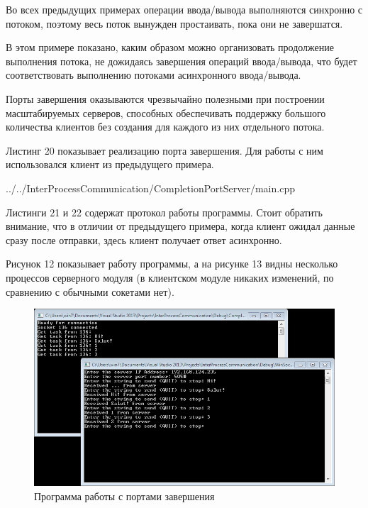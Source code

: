 \documentclass[a4paper, 12pt]{report}		%
\begin{document}
Во всех предыдущих примерах операции ввода/вывода выполняются синхронно с потоком, поэтому весь поток вынужден простаивать, пока они не завершатся.
\vspace{1em}

В этом примере показано, каким образом можно организовать продолжение выполнения потока, не дожидаясь завершения операций ввода/вывода, что будет соответствовать выполнению потоками асинхронного ввода/вывода.
\vspace{1em}

Порты завершения оказываются чрезвычайно полезными при построении масштабируемых серверов, способных обеспечивать поддержку большого количества клиентов без создания для каждого из них отдельного потока. 
\vspace{1em}

Листинг 20 показывает реализацию порта завершения. Для работы с ним использовался клиент из предыдущего примера.


{../../InterProcessCommunication/CompletionPortServer/main.cpp}

Листинги 21 и 22 содержат протокол работы программы. Стоит обратить внимание, что в отличии от предыдущего примера, когда клиент ожидал данные сразу после отправки, здесь клиент получает ответ асинхронно.





Рисунок 12 показывает работу программы, а на рисунке 13 видны несколько процессов серверного модуля (в клиентском модуле никаких изменений, по сравнению с обычными сокетами нет).

\begin{figure}[h!]
\centering
\includegraphics[scale=0.8]{res/12_Completion_Port}
\caption{Программа работы с портами завершения}
\end{figure}
\end{document}

